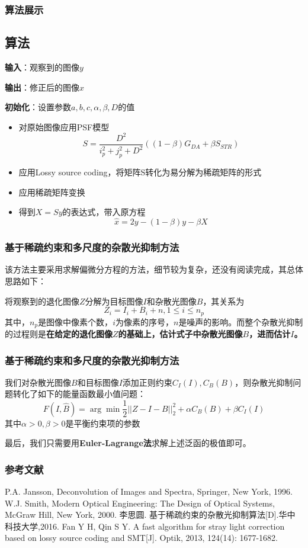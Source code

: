 \documentclass{beamer}
\begin{document}
\begin{frame}
\frametitle{算法展示}
\subsection{算法}
\textbf{输入}：观察到的图像$y$

\textbf{输出}：修正后的图像$\hat{x}$

\textbf{初始化}：设置参数$a,b,c,\alpha,\beta,D$的值\pause

\begin{itemize}
\item 对原始图像应用PSF模型
\begin{equation}
S=\frac{D^2}{i_p^2+j_p^2+D^2}((1-\beta)G_{DA}+\beta S_{STR})
\end{equation}\pause
\item 应用Lossy source coding，将矩阵S转化为易分解为稀疏矩阵的形式\pause
\item 应用稀疏矩阵变换\pause
\item 得到$X=Sy$的表达式，带入原方程
\begin{equation}
\hat{x}=2y-(1-\beta)y-\beta X
\end{equation}
\end{itemize}
\end{frame}
\begin{frame}
\frametitle{基于稀疏约束和多尺度的杂散光抑制方法}
该方法主要采用求解偏微分方程的方法，细节较为复杂，还没有阅读完成，其总体思路如下：

将观察到的退化图像$Z$分解为目标图像$I$和杂散光图像$B$，其关系为
\begin{equation}
Z_i=I_i+B_i+n, 1\leq i\leq n_p
\end{equation}\pause
其中，$n_p$是图像中像素个数，$i$为像素的序号，$n$是噪声的影响。而整个杂散光抑制的过程则是\textbf{在给定的退化图像$Z$的基础上，估计式子中杂散光图像$B$，进而估计$I$。}
\end{frame}
\begin{frame}
\frametitle{基于稀疏约束和多尺度的杂散光抑制方法}
我们对杂散光图像$B$和目标图像$I$添加正则约束$C_I(I), C_B(B)$，则杂散光抑制问题转化了如下的能量函数最小值问题：
\begin{equation}
F(\hat{I},\hat{B})=\arg\min \frac{1}{2}||Z-I-B||_2^2+\alpha C_B(B)+\beta C_I(I)
\end{equation}
其中$\alpha >0, \beta>0$是平衡约束项的参数\pause

最后，我们只需要用\textbf{Euler-Lagrange法}求解上述泛函的极值即可。
\end{frame}
\begin{frame}
\frametitle{参考文献}
\begin{thebibliography}{99}
P.A. Jansson, Deconvolution of Images and Spectra, Springer, New York, 1996.
W.J. Smith, Modern Optical Engineering: The Design of Optical Systems,
McGraw Hill, New York, 2000.
李思圆. 基于稀疏约束的杂散光抑制算法[D].华中科技大学,2016.
Fan Y H, Qin S Y. A fast algorithm for stray light correction based on lossy source coding and SMT[J]. Optik, 2013, 124(14): 1677-1682.
\end{thebibliography}
\end{frame}
\end{document}
